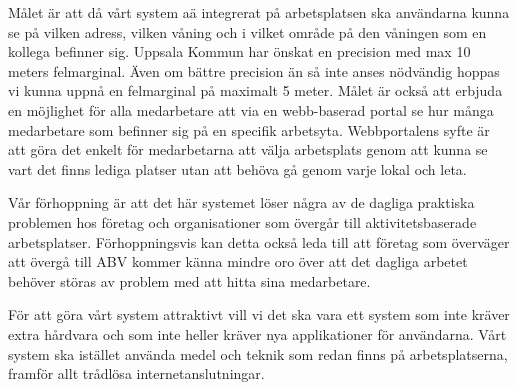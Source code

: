 \documentclass[swedish, a4paper,12pt]{article}
\begin{document}
Målet är att då vårt system aä integrerat på arbetsplatsen ska användarna kunna se på vilken adress, vilken våning och i vilket område på den våningen som en kollega befinner sig. Uppsala Kommun har önskat en precision med max 10 meters felmarginal. Även om bättre precision än så inte anses nödvändig hoppas vi kunna uppnå en felmarginal på maximalt 5 meter. Målet är också att erbjuda en möjlighet för alla medarbetare att via en webb-baserad portal se hur många medarbetare som befinner sig på en specifik arbetsyta. Webbportalens syfte är att göra det enkelt för medarbetarna att välja arbetsplats genom att kunna se vart det finns lediga platser utan att behöva gå genom varje lokal och leta.

Vår förhoppning är att det här systemet löser några av de dagliga praktiska problemen hos företag och organisationer som övergår till aktivitetsbaserade arbetsplatser. Förhoppningsvis kan detta också leda till att företag som överväger att övergå till ABV kommer känna mindre oro över att det dagliga arbetet behöver störas av problem med att hitta sina medarbetare.

För att göra vårt system attraktivt vill vi det ska vara ett system som inte kräver extra hårdvara och som inte heller kräver nya applikationer för användarna. Vårt system ska istället använda medel och teknik som redan finns på arbetsplatserna, framför allt trådlösa internetanslutningar.








\end{document}
